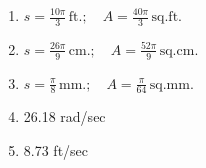 \begin{enumerate}
    \item $s = \frac{10\pi}{3}\,\mathrm{ft.}; \quad A = \frac{40\pi}{3}\,\mathrm{sq. ft.}$
    \item $s = \frac{26\pi}{9}\,\mathrm{cm.}; \quad A = \frac{52\pi}{9}\,\mathrm{sq. cm.}$
    \item $s = \frac{\pi}{8}\,\mathrm{mm.}; \quad A = \frac{\pi}{64}\,\mathrm{sq. mm.}$
    
    \item 26.18 rad/sec
    \item 8.73 ft/sec
\end{enumerate}